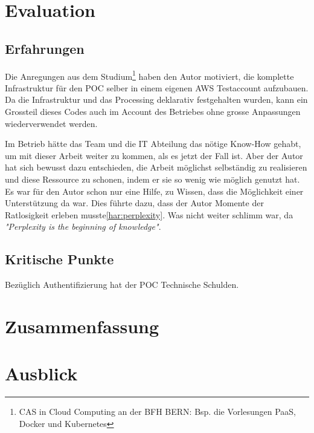 \section{Evaluation}
\subsection{Erfahrungen}
Die Anregungen aus dem Studium\footnote{CAS in Cloud Computing an der BFH BERN: Bsp. die Vorlesungen PaaS, Docker und Kubernetes} haben den Autor motiviert, die komplette Infrastruktur für den POC selber in einem eigenen AWS Testaccount aufzubauen. Da die Infrastruktur und das Processing deklarativ festgehalten wurden, kann ein Grossteil dieses Codes auch im Account des Betriebes ohne grosse Anpassungen wiederverwendet werden.

Im Betrieb hätte das Team und die IT Abteilung das nötige Know-How gehabt, um mit dieser Arbeit weiter zu kommen, als es jetzt der Fall ist. Aber der Autor hat sich bewusst dazu entschieden, die Arbeit möglichst selbständig zu realisieren und  diese Ressource zu schonen, indem er sie so wenig wie möglich genutzt hat. Es war für den Autor schon nur eine Hilfe, zu Wissen, dass die Möglichkeit einer Unterstützung da war. Dies führte dazu, dass der Autor Momente der Ratlosigkeit erleben musste\ref{har:perplexity}. Was nicht weiter schlimm war, da \textit{"Perplexity is the beginning of knowledge"}\autocite[33]{CloudNativ:1}.


\subsection{Kritische Punkte}
Bezüglich Authentifizierung hat der POC Technische Schulden.

\section{Zusammenfassung}


\section{Ausblick}